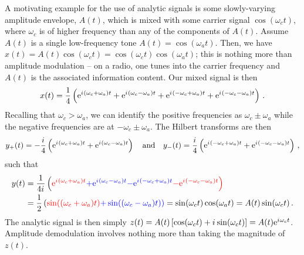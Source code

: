 \begin{exmp}
  A motivating example for the use of analytic signals is some slowly-varying
  amplitude envelope, $A(t)$, which is mixed with some carrier signal $\cos(\omega_c t)$,
  where $\omega_c$ is of higher frequency than any of the components of $A(t)$.
  Assume $A(t)$ is a single low-frequency tone $A(t) = \cos(\omega_a t)$.
  Then, we have $x(t) = A(t)\cos(\omega_c t) = \cos(\omega_c t)\cos(\omega_a t)$;
  this is nothing more than amplitude modulation -- on a radio, one tunes into
  the carrier frequency and $A(t)$ is the associated information content. Our
  mixed signal is then
  \begin{displaymath}
    x(t) = \frac{1}{4}\left(
    \mathrm{e}^{{i\mkern1mu}(\omega_c + \omega_a)t} + \mathrm{e}^{{i\mkern1mu}(\omega_c - \omega_a)t} +
    \mathrm{e}^{{i\mkern1mu}(-\omega_c + \omega_a)t} + \mathrm{e}^{{i\mkern1mu}(-\omega_c - \omega_a)t}
    \right) \,.
  \end{displaymath}
  Recalling that $\omega_c > \omega_a$, we can identify the positive frequencies as
  $\omega_c \pm \omega_a$ while the negative frequencies are at $-\omega_c \pm\omega_a$. The
  Hilbert transforms are then
  \begin{displaymath}
    y_+(t) = -\frac{{i\mkern1mu}}{4}\left(\mathrm{e}^{{i\mkern1mu}(\omega_c + \omega_a)t} + \mathrm{e}^{{i\mkern1mu}(\omega_c - \omega_a)t}\right) 
    \quad\mathrm{and}\quad
    y_-(t) = \frac{{i\mkern1mu}}{4}\left(\mathrm{e}^{{i\mkern1mu}(-\omega_c + \omega_a)t} + \mathrm{e}^{{i\mkern1mu}(-\omega_c - \omega_a)t}\right) \,,
  \end{displaymath}
  such that
  \begin{align*}
    y(t) &= \frac{1}{4{i\mkern1mu}}\left(
    \color{red}{\mathrm{e}^{{i\mkern1mu}(\omega_c + \omega_a)t}} \color{blue}{+ \mathrm{e}^{{i\mkern1mu}(\omega_c - \omega_a)t}}
    \color{blue}{-\mathrm{e}^{{i\mkern1mu}(-\omega_c + \omega_a)t}} \color{red}{- \mathrm{e}^{{i\mkern1mu}(-\omega_c - \omega_a)t}} 
    \right) \\
    &= \frac{1}{2}\left(
    \color{red}{\sin((\omega_c + \omega_a)t)} \color{blue}{+ \sin((\omega_c - \omega_a)t)}\right)
    = \sin(\omega_c t)\cos(\omega_a t) = A(t)\sin(\omega_c t) \,.
  \end{align*}
  The analytic signal is then simply
  $z(t) = A(t)\left[\cos(\omega_c t) + {i\mkern1mu}\sin(\omega_c t)\right] = A(t)\mathrm{e}^{{i\mkern1mu}\omega_c t}$.
  Amplitude demodulation involves nothing more than taking the magnitude of $z(t)$.
\end{exmp}

